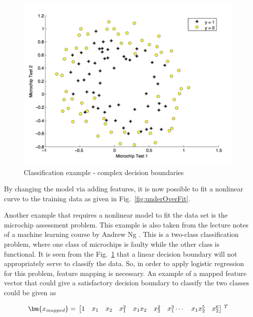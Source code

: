 \begin{figure}
\begin{center}
\includegraphics[width=13cm]{figures/classificationMicrochip}    %
\caption{Classification example - complex decision boundaries \cite{andrewNg_MachLearning}} 
\label{fig:classificationEx3}
\end{center}
\end{figure}

By changing the model via adding features, it is now possible to fit a nonlinear curve to the training data as given in Fig.~\ref{fig:underOverFit}.

Another example that requires a nonlinear model to fit the data set is the microchip assessment problem.
This example is also taken from the lecture notes of a machine learning course by Andrew Ng \cite{andrewNgMachLearning}. 
This is a two-class classification problem, where one class of microchips is faulty while the other class is functional.
It is seen from the Fig.~\ref{fig:classificationEx3} that a linear decision boundary will not appropriately serve to classify the data. 
So, in order to apply logistic regression for this problem, feature mapping is necessary. 
An example of a mapped feature vector that could give a satisfactory decision boundary to classify the two classes could be given as

\begin{equation}{\label{eqn:featureMapping2}}
\bm{x_{mapped}}
=\,
\begin{bmatrix}
1 & x_1 & x_2 & x_1^2 & x_1x_2 & x_2^2 & x_1^3 \cdots & x_1x_2^5 & x_2^6 
\end{bmatrix}
\,^ T
\end{equation} 

